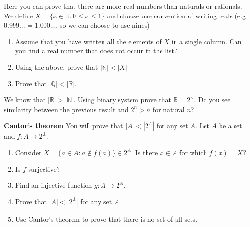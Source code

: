 \begin{prob}
	Here you can prove that there are more real numbers than naturals or rationals. We define $X=\{x\in \mathbb R : 0\le x\le 1\}$ and choose one
	 convention of writing reals (e.g 0.999... = 1.000..., so we can choose to use nines)
	\begin{enumerate}
		\item Assume that you have written all the elements of $X$ in a single column. Can you find a real number that does not occur in the list?
		\item Using the above, prove that $|\mathbb N| < |X|$
		\item Prove that $|\mathbb Q| < |\mathbb R|.$
	\end{enumerate}
\end{prob}

\begin{prob}
	We know that $|\mathbb R| > |\mathbb N|.$ Using binary system prove that $\mathbb R=2^\mathbb N.$ Do you see similarity between the previous result
	and $2^n > n$ for natural $n$?
\end{prob}

\begin{prob}
	\textbf{Cantor's theorem} You will prove that $|A|<\left|2^A\right|$ for any set $A$. Let $A$ be a set and $f:A\to 2^A.$
	\begin{enumerate}
		\item Consider $X=\{a\in A : a\notin f(a)\}\in 2^A$. Is there $x\in A$ for which $f(x)=X?$
		\item Is $f$ surjective?
		\item Find an injective function $g: A\to 2^A.$
		\item Prove that $|A| < |2^A|$ for any set $A$.
		\item Use Cantor's theorem to prove that there is no set of all sets.
	\end{enumerate}
\end{prob}

